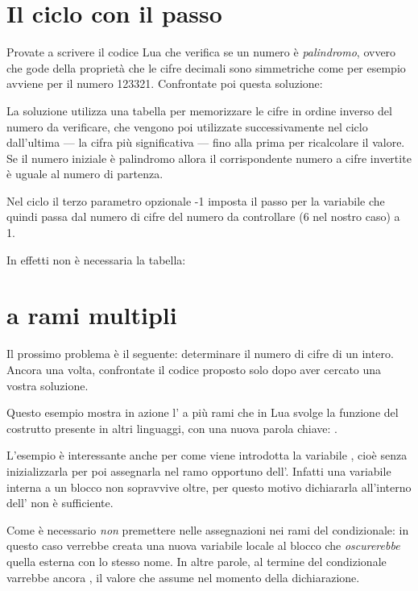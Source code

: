 \section{Il ciclo  con il passo}

Provate a scrivere il codice Lua che verifica se un numero è \emph{palindromo},
ovvero che gode della proprietà che le cifre decimali sono simmetriche come per
esempio avviene per il numero 123321. Confrontate poi questa soluzione:

La soluzione utilizza una tabella per memorizzare le cifre in ordine inverso
del numero da verificare, che vengono poi utilizzate successivamente nel ciclo
 dall'ultima --- la cifra più significativa --- fino alla prima per
ricalcolare il valore. Se il numero iniziale è palindromo allora il
corrispondente numero a cifre invertite è uguale al numero di partenza.

Nel ciclo  il terzo parametro opzionale -1 imposta il passo per la
variabile  che quindi passa dal numero di cifre del numero da
controllare (6 nel nostro caso) a 1.

In effetti non è necessaria la tabella:


\section{ a rami multipli}

Il prossimo problema è il seguente: determinare il numero di cifre di un
intero. Ancora una volta, confrontate il codice proposto solo dopo aver cercato
una vostra soluzione.

Questo esempio mostra in azione l' a più rami che in Lua svolge la
funzione del costrutto  presente in altri linguaggi, con una nuova
parola chiave: .

L'esempio è interessante anche per come viene introdotta la variabile
, cioè senza inizializzarla per poi assegnarla nel ramo opportuno
dell'. Infatti una variabile interna a un blocco non sopravvive oltre,
per questo motivo dichiararla all'interno dell' non è sufficiente.

Come è necessario \emph{non} premettere  nelle assegnazioni nei rami
del condizionale: in questo caso verrebbe creata una nuova variabile locale al
blocco che \emph{oscurerebbe} quella esterna con lo stesso nome. In altre
parole, al termine del condizionale  varrebbe ancora , il
valore che assume nel momento della dichiarazione.



